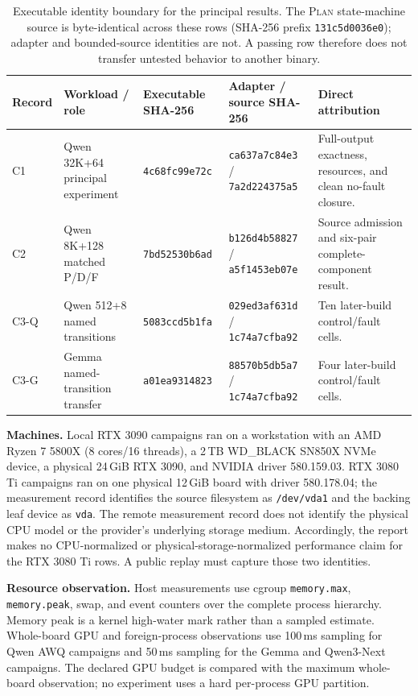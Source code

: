 \documentclass[letterpaper,twocolumn,10pt]{article}
\newcommand{\Plan}{\textsc{Plan}\xspace}
\newcommand{\GiB}{\,GiB\xspace}
\newcommand{\para}[1]{\smallskip\noindent\textbf{#1.}}
\begin{document}
\begin{table}[t]
  \centering
  \scriptsize
  \caption{Executable identity boundary for the principal results.  The \Plan
  state-machine source is byte-identical across these rows (SHA-256 prefix
  \texttt{131c5d0036e0}); adapter and bounded-source identities are not.  A
  passing row therefore does not transfer untested behavior to another binary.}
  \label{tab:identities}
  \begin{tabularx}{\textwidth}{@{}p{1.7cm}p{2.1cm}p{2.25cm}p{3.0cm}X@{}}
    \toprule
    Record & Workload / role & Executable SHA-256 & Adapter / source SHA-256 & Direct attribution \\
    \midrule
    C1 & Qwen 32K+64 principal experiment & \texttt{4c68fc99e72c} & \texttt{ca637a7c84e3} / \texttt{7a2d224375a5} & Full-output exactness, resources, and clean no-fault closure. \\
    C2 & Qwen 8K+128 matched P/D/F & \texttt{7bd52530b6ad} & \texttt{b126d4b58827} / \texttt{a5f1453eb07e} & Source admission and six-pair complete-component result. \\
    C3-Q & Qwen 512+8 named transitions & \texttt{5083ccd5b1fa} & \texttt{029ed3af631d} / \texttt{1c74a7cfba92} & Ten later-build control/fault cells. \\
    C3-G & Gemma named-transition transfer & \texttt{a01ea9314823} & \texttt{88570b5db5a7} / \texttt{1c74a7cfba92} & Four later-build control/fault cells. \\
    \bottomrule
  \end{tabularx}
\end{table}

\para{Machines}
Local RTX 3090 campaigns ran on a workstation with an AMD Ryzen 7 5800X
(8 cores/16 threads), a 2\,TB WD\_BLACK SN850X NVMe device, a physical 24\GiB
RTX 3090, and NVIDIA driver 580.159.03.  RTX 3080 Ti campaigns ran on one
physical 12\GiB board with driver 580.178.04; the measurement record identifies
the source filesystem as \texttt{/dev/vda1} and the backing leaf device as
\texttt{vda}.  The remote measurement record does not identify the physical CPU
model or the provider's underlying storage medium.  Accordingly, the report
makes no CPU-normalized or physical-storage-normalized performance claim for
the RTX 3080 Ti rows.  A public replay must capture those two identities.

\para{Resource observation}
Host measurements use cgroup \texttt{memory.max}, \texttt{memory.peak},
swap, and event counters over the complete process hierarchy.  Memory peak is a
kernel high-water mark rather than a sampled estimate.  Whole-board GPU and
foreign-process observations use 100\,ms sampling for Qwen AWQ campaigns and
50\,ms sampling for the Gemma and Qwen3-Next campaigns.  The declared GPU
budget is compared with the maximum whole-board observation; no experiment
uses a hard per-process GPU partition.
\end{document}

